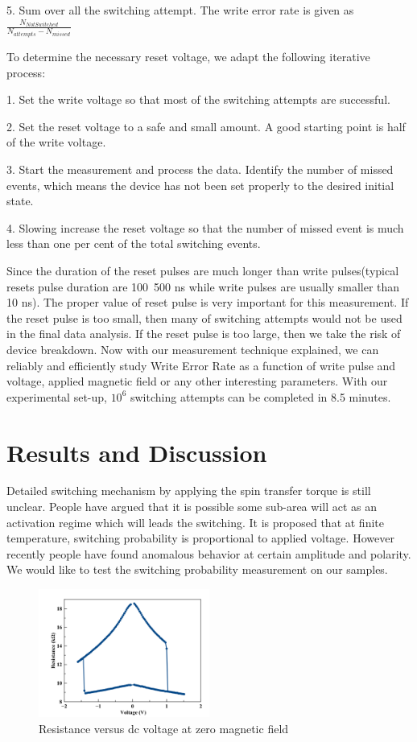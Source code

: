 5. Sum over all the switching attempt. The write error rate is given as $\frac{N_{NotSwitched}}{N_{attempts}-N_{missed}}$

To determine the necessary reset voltage, we adapt the following iterative process:

1. Set the write voltage so that most of the switching attempts are successful.

2. Set the reset voltage to a safe and small amount. A good starting point is half of the write voltage.

3. Start the measurement and process the data. Identify the number of missed events, which means the device has not been set properly to the desired initial state.

4. Slowing increase the reset voltage so that the number of missed event is much less than one per cent of the total switching events.

Since the duration of the reset pulses are much longer than write pulses(typical resets pulse duration are 100~500 ns while write pulses are usually smaller than 10 ns). The proper value of reset pulse is very important for this measurement. If the reset pulse is too small, then many of switching attempts would not be used in the final data analysis. If the reset pulse is too large, then we take the risk of device breakdown. Now with our measurement technique explained, we can reliably and efficiently study Write Error Rate as a function of write pulse and voltage, applied magnetic field or any other interesting parameters. With our experimental set-up, $10^6$ switching attempts can be completed in 8.5 minutes.


\section{Results and Discussion}
Detailed switching mechanism by applying the spin transfer torque is still unclear. People have argued that it is possible some sub-area will act as an activation regime which will leads the switching\cite{Sub}. It is proposed that at finite temperature, switching probability is proportional to applied voltage\cite{Sun1991}. However recently people have found anomalous behavior at certain amplitude and polarity\cite{Back-hopping}\cite{High_bias}\cite{BitError}. We would like to test the switching probability measurement on our samples.

\begin{figure}[h!]
    \centering
    \includegraphics[width=0.5\textwidth]{fig/mr.png}
    \caption{Resistance versus dc voltage at zero magnetic field}
    \label{fig:mr_wer}
\end{figure}


